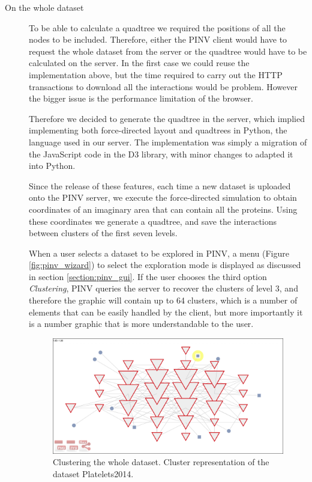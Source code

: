 \begin{description}
\item[On the whole dataset]
To be able to calculate a quadtree we required the positions of all the nodes to be included. Therefore, either the PINV client would have to request the whole dataset from the server or the quadtree would have to be calculated on the server. In the first case we could reuse the implementation above, but the time required to carry out the HTTP transactions to download all the interactions would be problem. However the bigger issue is the performance limitation of the browser.

Therefore we decided to generate the quadtree in the server, which implied implementing both force-directed layout and quadtrees in Python, the language used in our server. The implementation was simply a migration of the JavaScript code in the D3 library, with minor changes to adapted it into Python.

Since the release of these features, each time a new dataset is uploaded onto the PINV server, we execute the force-directed simulation to obtain coordinates of an imaginary area that can contain all the proteins. Using these coordinates we generate a quadtree, and save the interactions between clusters of the first seven levels.

When a user selects a dataset to be explored in PINV, a menu (Figure \ref{fig:pinv_wizard}) to select the exploration mode is displayed as discussed in section \ref{section:pinv_gui}. If the user chooses the third option \emph{Clustering}, PINV queries the server to recover the clusters of level 3, and therefore the graphic will contain up to 64 clusters, which is a number of elements that can be easily handled by the client, but more importantly it is a number graphic that is more understandable to the user.

\begin{figure}[ht]
\centering
\includegraphics[width=\textwidth]{figures/dataset_cluster.png}
\caption[Clustering the whole dataset.]{Clustering the whole dataset. Cluster representation of the dataset Platelets2014.
\label{fig:dataset_cluster}}
\end{figure}


\end{description}
